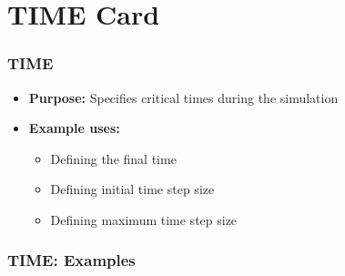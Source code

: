 \section{TIME Card}

\begin{frame}\frametitle{TIME}

\begin{itemize}
\item[] \textbf{Purpose:} Specifies critical times during the simulation
\item[] \textbf{Example uses:}
\begin{itemize}
  \item Defining the final time
  \item Defining initial time step size
  \item Defining maximum time step size
\end{itemize}
\end{itemize}

\end{frame}

\begin{frame}[fragile]\frametitle{TIME: Examples}

\end{frame}
